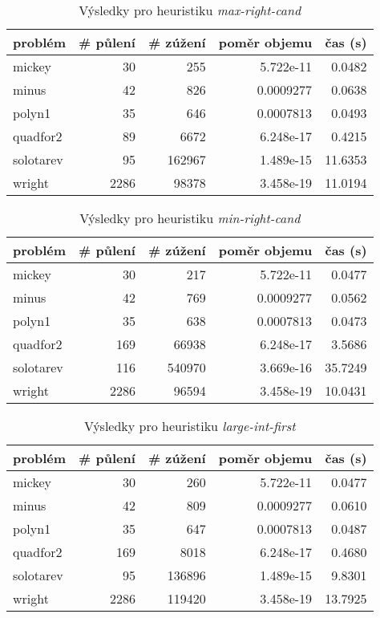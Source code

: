{\begin{table}[H]
\centering
\begin{tabular}{lrrrr}
\hline
problém & \# půlení & \# zúžení & poměr objemu & čas (s) \\ \hline
mickey & 30 & 255 & 5.722e-11 & 0.0482 \\
minus & 42 & 826 & 0.0009277 & 0.0638 \\
polyn1 & 35 & 646 & 0.0007813 & 0.0493 \\
quadfor2 & 89 & 6672 & 6.248e-17 & 0.4215 \\
solotarev & 95 & 162967 & 1.489e-15 & 11.6353 \\
wright & 2286 & 98378 & 3.458e-19 & 11.0194 \\
\end{tabular}
\caption{Výsledky pro heuristiku \emph{max-right-cand}}
\label{max-right-cand}
\end{table}



\begin{table}[H]
\centering
\begin{tabular}{lrrrr}
\hline
problém & \# půlení & \# zúžení & poměr objemu & čas (s) \\ \hline
mickey & 30 & 217 & 5.722e-11 & 0.0477 \\
minus & 42 & 769 & 0.0009277 & 0.0562 \\
polyn1 & 35 & 638 & 0.0007813 & 0.0473 \\
quadfor2 & 169 & 66938 & 6.248e-17 & 3.5686 \\
solotarev & 116 & 540970 & 3.669e-16 & 35.7249 \\
wright & 2286 & 96594 & 3.458e-19 & 10.0431 \\
\end{tabular}
\caption{Výsledky pro heuristiku \emph{min-right-cand}}
\label{min-right-cand}
\end{table}



\begin{table}[H]
\centering
\begin{tabular}{lrrrr}
\hline
problém & \# půlení & \# zúžení & poměr objemu & čas (s) \\ \hline
mickey & 30 & 260 & 5.722e-11 & 0.0477 \\
minus & 42 & 809 & 0.0009277 & 0.0610 \\
polyn1 & 35 & 647 & 0.0007813 & 0.0487 \\
quadfor2 & 169 & 8018 & 6.248e-17 & 0.4680 \\
solotarev & 95 & 136896 & 1.489e-15 & 9.8301 \\
wright & 2286 & 119420 & 3.458e-19 & 13.7925 \\
\end{tabular}
\caption{Výsledky pro heuristiku \emph{large-int-first}}
\label{large-int-first}
\end{table}



}
